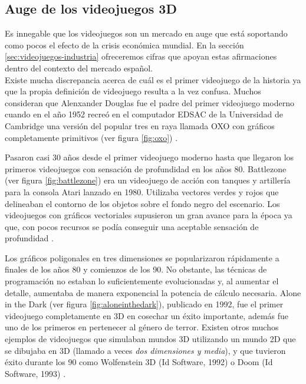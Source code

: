 \subsection{Auge de los videojuegos 3D}

Es innegable que los videojuegos son un mercado en auge que está soportando
como pocos el efecto de la crisis económica mundial. En la sección
\ref{sec:videojuegos-industria} ofreceremos cifras que apoyan estas afirmaciones
dentro del contexto del mercado español.\\

Existe mucha discrepancia acerca de cuál es el primer videojuego de la
historia ya que la propia definición de videojuego resulta a la vez confusa.
Muchos consideran que Alenxander Douglas fue el padre del primer videojuego
moderno cuando en el año 1952 recreó en el computador EDSAC de la Universidad
de Cambridge una versión del popular tres en raya llamada OXO con gráficos
completamente primitivos (ver figura \ref{fig:oxo}) \cite{website:historia-videojuegos}.\\


Pasaron casi 30 años desde el primer videojuego moderno hasta que llegaron
los primeros videojuegos con sensación de profundidad en los años 80. Battlezone
(ver figura \ref{fig:battlezone}) era un videojuego de acción con tanques
y artillería para la consola Atari lanzado en 1980. Utilizaba vectores
verdes y rojos que delineaban el contorno de los objetos sobre el fondo
negro del escenario. Los videojuegos con gráficos vectoriales supusieron
un gran avance para la época ya que, con pocos recursos se podía conseguir
una aceptable sensación de profundidad \cite{website:historia-videojuegos}.\\


Los gráficos poligonales en tres dimensiones se popularizaron rápidamente
a finales de los años 80 y comienzos de los 90. No obstante, las técnicas
de programación no estaban lo suficientemente evolucionadas y, al aumentar
el detalle, aumentaba de manera exponencial la potencia de cálculo necesaria.
Alone in the Dark (ver figura \ref{fig:aloneinthedark}), publicado en 1992,
fue el primer videojuego completamente en 3D en cosechar un éxito importante,
además fue uno de los primeros en pertenecer al género de terror. Existen
otros muchos ejemplos de videojuegos que simulaban mundos 3D utilizando
un mundo 2D que se dibujaba en 3D (llamado a veces \emph{dos dimensiones y media}),
y que tuvieron éxito durante los 90 como Wolfenstein 3D (Id Software, 1992)
o Doom (Id Software, 1993) \cite{website:historia-videojuegos}.\\

